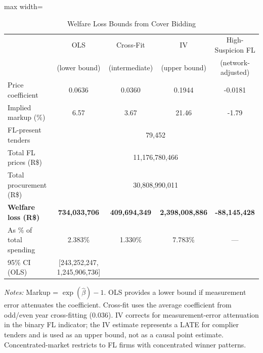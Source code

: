 \begin{table}[htbp]
\centering
\caption{Welfare Loss Bounds from Cover Bidding}
\label{tab:welfare_bounds}
\begin{adjustbox}{max width=\textwidth}
\begin{threeparttable}
\small
\begin{tabular}{lcccc}
\toprule
 & OLS & Cross-Fit & IV & High-Suspicion FL \\
 & (lower bound) & (intermediate) & (upper bound) & (network-adjusted) \\
\midrule
Price coefficient & 0.0636 & 0.0360 & 0.1944 & -0.0181 \\
Implied markup (\%) & 6.57 & 3.67 & 21.46 & -1.79 \\
\midrule
FL-present tenders & \multicolumn{4}{c}{79,452} \\
Total FL prices (R\$) & \multicolumn{4}{c}{11,176,780,466} \\
Total procurement (R\$) & \multicolumn{4}{c}{30,808,990,011} \\
\midrule
\textbf{Welfare loss (R\$)} & \textbf{734,033,706} & \textbf{409,694,349} & \textbf{2,398,008,886} & \textbf{-88,145,428} \\
As \% of total spending & 2.383\% & 1.330\% & 7.783\% & --- \\
95\% CI (OLS) & [243,252,247, 1,245,906,736] & & & \\
\bottomrule
\end{tabular}
\begin{tablenotes}
\small
\item \textit{Notes:} Markup = $\exp(\hat{\beta}) - 1$.
OLS provides a lower bound if measurement error attenuates the coefficient.
Cross-fit uses the average coefficient from odd/even year cross-fitting (0.036).
IV corrects for measurement-error attenuation in the binary FL indicator; the IV estimate represents a LATE for complier tenders and is used as an upper bound, not as a causal point estimate.
Concentrated-market restricts to FL firms with concentrated winner patterns.
\end{tablenotes}
\end{threeparttable}
\end{adjustbox}
\end{table}
